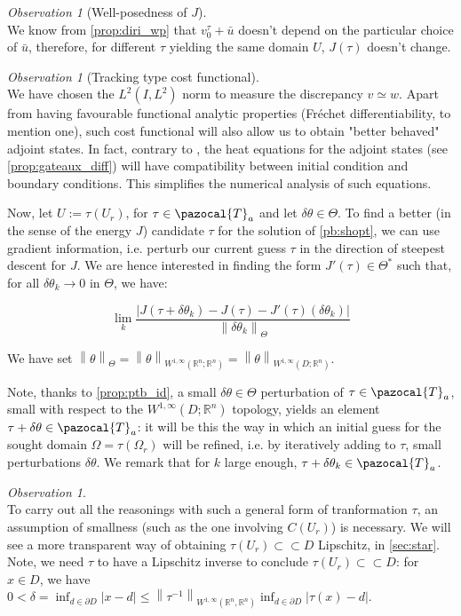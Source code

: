 \documentclass[english,a4paper,9pt,oneside]{scrbook}	%
\theoremstyle{break}
\theoremstyle{remark}
\newtheorem{obs}[equation]{Observation}
\newcommand{\mR}{\mathbb{R}}
\newcommand{\norm}[1]{\left\lVert#1\right\rVert}
\newcommand{\cc}{\subset\subset}
\newcommand{\cT}{\pazocal{T}}
\newcommand{\te}{\theta}
\newcommand{\Te}{\Theta}
\begin{document}
\begin{obs}[Well-posedness of $J$]
\mbox{}\\
We know from \cref{prop:diri_wp} that $v_0^\tau + \bar{u}$ doesn't depend on the particular choice of $\bar{u}$, therefore, for different $\tau$ yielding the same domain $U$, $J(\tau)$ doesn't change.

\end{obs}

\begin{obs}[Tracking type cost functional]
\mbox{}\\
We have chosen the $L^2(I,L^2)$ norm to measure the discrepancy $v\simeq w$. Apart from having favourable functional analytic properties (Fréchet differentiability, to mention one), such cost functional will also allow us to obtain "better behaved" adjoint states. In fact, contrary to \cite{harbrecht}, the heat equations for the adjoint states (see \cref{prop:gateaux_diff}) will have compatibility between initial condition and boundary conditions. This simplifies the numerical analysis of such equations.
\end{obs}


Now, let $U:=\tau(U_r)$, for $\tau \in \cT_a$ and let $\delta \te \in \Te$. To find a better (in the sense of the energy $J$) candidate $\tau$ for the solution of \cref{pb:shopt}, we can use gradient information, i.e. perturb our current guess $\tau$ in the direction of steepest descent for $J$. We are hence interested in finding the form $J'(\tau) \in \Te^*$ such that, for all $\delta \te_k \rightarrow 0$ in $\Te$, we have:


$$\lim_{k}\frac{|J(\tau+\delta \te_k)-J(\tau)-J'(\tau)(\delta \te_k)|}{\norm{\delta \te_k}_{\Te}}$$

We have set $\norm{\te}_\Te = \norm{\te}_{W^{1,\infty}(\mR^n;\mR^n)}=\norm{\te}_{W^{1,\infty}(D;\mR^n)}$.

Note, thanks to \cref{prop:ptb_id}, a small $\delta \te \in \Te$ perturbation of $\tau \in \cT_a$, small with respect to the $W^{1,\infty}(D;\mR^n)$ topology, yields an element $\tau +\delta  \te \in \cT_a$: it will be this the way in which an initial guess for the sought domain $\Omega = \tau(\Omega_r)$ will be refined, i.e. by iteratively adding to $\tau$, small perturbations $\delta \te$. We remark that for $k$ large enough, $\tau+\delta \te_k \in \cT_a$.

\begin{obs}
\mbox{}\\
To carry out all the reasonings with such a general form of tranformation $\tau$, an assumption of smallness (such as the one involving $C(U_r)$) is necessary. We will see a more transparent way of obtaining $\tau(U_r)\cc D$ Lipschitz, in \cref{sec:star}.
\mbox{}\\
Note, we need $\tau$ to have a Lipschitz inverse to conclude $\tau(U_r)\cc D$: for $x \in D$, we have $0<\delta = \inf_{d \in \partial D}|x-d|\leq \norm{\tau^{-1}}_{W^{1,\infty}(\mR^n,\mR^n)}\inf_{d \in \partial D}|\tau(x)-d|$.
\end{obs}
\end{document}
